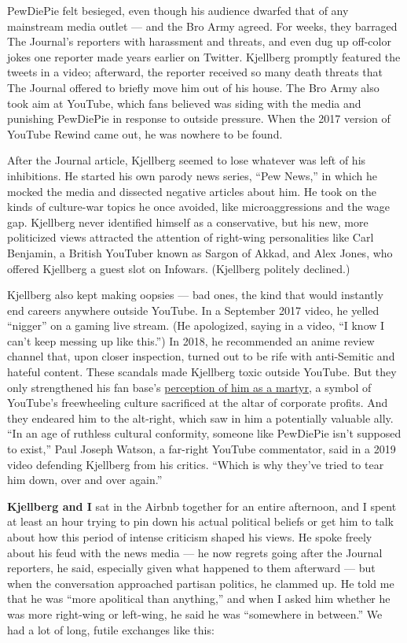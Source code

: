 PewDiePie felt besieged, even though his audience dwarfed that of any
mainstream media outlet --- and the Bro Army agreed. For weeks, they
barraged The Journal's reporters with harassment and threats, and even
dug up off-color jokes one reporter made years earlier on Twitter.
Kjellberg promptly featured the tweets in a video; afterward, the
reporter received so many death threats that The Journal offered to
briefly move him out of his house. The Bro Army also took aim at
YouTube, which fans believed was siding with the media and punishing
PewDiePie in response to outside pressure. When the 2017 version of
YouTube Rewind came out, he was nowhere to be found.

After the Journal article, Kjellberg seemed to lose whatever was left of
his inhibitions. He started his own parody news series, ``Pew News,'' in
which he mocked the media and dissected negative articles about him. He
took on the kinds of culture-war topics he once avoided, like
microaggressions and the wage gap. Kjellberg never identified himself as
a conservative, but his new, more politicized views attracted the
attention of right-wing personalities like Carl Benjamin, a British
YouTuber known as Sargon of Akkad, and Alex Jones, who offered Kjellberg
a guest slot on Infowars. (Kjellberg politely declined.)

Kjellberg also kept making oopsies --- bad ones, the kind that would
instantly end careers anywhere outside YouTube. In a September 2017
video, he yelled ``nigger'' on a gaming live stream. (He apologized,
saying in a video, ``I know I can't keep messing up like this.'') In
2018, he recommended an anime review channel that, upon closer
inspection, turned out to be rife with anti-Semitic and hateful content.
These scandals made Kjellberg toxic outside YouTube. But they only
strengthened his fan base's
\href{https://www.nytimes3xbfgragh.onion/2017/02/16/magazine/youtubes-monster-pewdiepie-and-his-populist-revolt.html}{perception
of him as a martyr}, a symbol of YouTube's freewheeling culture
sacrificed at the altar of corporate profits. And they endeared him to
the alt-right, which saw in him a potentially valuable ally. ``In an age
of ruthless cultural conformity, someone like PewDiePie isn't supposed
to exist,'' Paul Joseph Watson, a far-right YouTube commentator, said in
a 2019 video defending Kjellberg from his critics. ``Which is why
they've tried to tear him down, over and over again.''

\textbf{Kjellberg and I} sat in the Airbnb together for an entire
afternoon, and I spent at least an hour trying to pin down his actual
political beliefs or get him to talk about how this period of intense
criticism shaped his views. He spoke freely about his feud with the news
media --- he now regrets going after the Journal reporters, he said,
especially given what happened to them afterward --- but when the
conversation approached partisan politics, he clammed up. He told me
that he was ``more apolitical than anything,'' and when I asked him
whether he was more right-wing or left-wing, he said he was ``somewhere
in between.'' We had a lot of long, futile exchanges like this:

